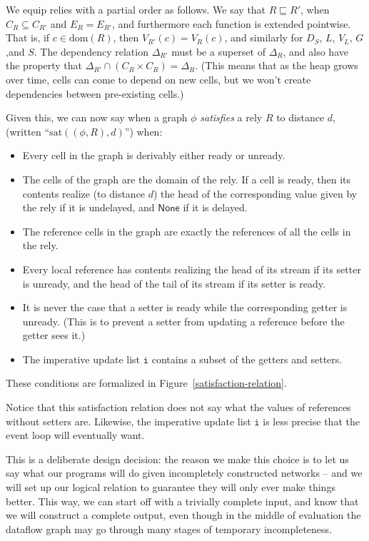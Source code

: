 \documentclass[preprint]{sigplanconf}
\newcommand{\dom}[1]{\mathrm{dom}({#1})}
\newcommand{\term}[1]{\ensuremath{\mathtt{{#1}}}}
\newcommand{\None}{\mathsf{None}}
\newcommand{\satisfy}[2]{\mathrm{sat}({#1},{#2})}
\begin{document}
We equip relies with a partial order as follows. We say that $R
\sqsubseteq R'$, when $C_R \subseteq C_{R'}$ and $E_R = E_{R'}$, and
furthermore each function is extended pointwise. That is, if $c \in
\dom{R}$, then $V_{R'}(c) = V_{R}(c)$, and similarly for $D_S$, $L$,
$V_L$, $G$,and $S$. The dependency relation $\Delta_{R'}$ must be a
superset of $\Delta_R$, and also have the property that $\Delta_{R'}
\cap (C_R \times C_R) = \Delta_R$. (This means that as the heap grows
over time, cells can come to depend on new cells, but we won't create
dependencies between pre-existing cells.)

Given this, we can now say when a graph $\phi$ \emph{satisfies} a rely $R$ to
distance $d$, (written ``$\satisfy{(\phi, R)}{d}$'') when:
\begin{itemize}
  \item Every cell in the graph is derivably either ready or unready. 
  \item The cells of the graph are the domain of the rely. If a cell
    is ready, then its contents realize (to distance $d$) the head of
    the corresponding value given by the rely if it is undelayed, and
    $\None$ if it is delayed.
  \item The reference cells in the graph are exactly the references
    of all the cells in the rely.
  \item Every local reference has contents realizing the head of its
    stream if its setter is unready, and the head of the tail of its
    stream if its setter is ready. 
  \item It is never the case that a setter is ready while the
    corresponding getter is unready. (This is to prevent a setter
    from updating a reference before the getter sees it.)
  \item The imperative update list \term{i} contains a subset of 
    the getters and setters. 
\end{itemize}

These conditions are formalized in Figure~\ref{satisfaction-relation}. 

Notice that this satisfaction relation does not say what the values of
references without setters are. Likewise, the imperative update list
\term{i} is less precise that the event loop will eventually want.

This is a deliberate design decision: the reason we make this choice
is to let us say what our programs will do given incompletely
constructed networks -- and we will set up our logical relation to
guarantee they will only ever make things better. This way, we can
start off with a trivially complete input, and know that we will
construct a complete output, even though in the middle of evaluation
the dataflow graph may go through many stages of temporary
incompleteness.
\end{document}
